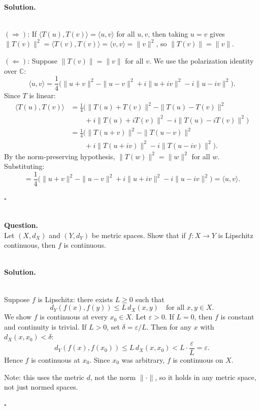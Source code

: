 \documentclass{article}
\begin{document}
\noindent\\
\textbf{Solution.}\\
\quad\\
\begin{mdframed}[linewidth=1pt]
$(\Rightarrow)$: If $\langle T(u), T(v) \rangle = \langle u, v \rangle$ for all $u, v$, then taking $u = v$ gives $\|T(v)\|^2 = \langle T(v), T(v) \rangle = \langle v, v \rangle = \|v\|^2$, so $\|T(v)\| = \|v\|$.

$(\Leftarrow)$: Suppose $\|T(v)\| = \|v\|$ for all $v$. We use the polarization identity over $\mathbb{C}$:
\[
\langle u, v \rangle = \frac{1}{4}\bigl(\|u+v\|^2 - \|u-v\|^2 + i\|u+iv\|^2 - i\|u-iv\|^2\bigr).
\]
Since $T$ is linear:
\begin{align*}
\langle T(u), T(v) \rangle &= \frac{1}{4}\bigl(\|T(u)+T(v)\|^2 - \|T(u)-T(v)\|^2 \\
&\qquad + i\|T(u)+iT(v)\|^2 - i\|T(u)-iT(v)\|^2\bigr) \\
&= \frac{1}{4}\bigl(\|T(u+v)\|^2 - \|T(u-v)\|^2 \\
&\qquad + i\|T(u+iv)\|^2 - i\|T(u-iv)\|^2\bigr).
\end{align*}
By the norm-preserving hypothesis, $\|T(w)\|^2 = \|w\|^2$ for all $w$. Substituting:
\[
= \frac{1}{4}\bigl(\|u+v\|^2 - \|u-v\|^2 + i\|u+iv\|^2 - i\|u-iv\|^2\bigr) = \langle u, v \rangle.
\]

\hfill $\square$
\end{mdframed}

\bigskip

\hfill \break  $~\!\!$ \dotfill \medskip \\
\textbf{Question.}\\
Let $(X, d_X)$ and $(Y, d_Y)$ be metric spaces. Show that if $f: X \to Y$ is Lipschitz continuous, then $f$ is continuous.

\noindent\\
\textbf{Solution.}\\
\quad\\
\begin{mdframed}[linewidth=1pt]
Suppose $f$ is Lipschitz: there exists $L \ge 0$ such that
\[
d_Y(f(x), f(y)) \le L\, d_X(x, y) \quad \text{for all } x, y \in X.
\]
We show $f$ is continuous at every $x_0 \in X$. Let $\varepsilon > 0$. If $L = 0$, then $f$ is constant and continuity is trivial. If $L > 0$, set $\delta = \varepsilon / L$. Then for any $x$ with $d_X(x, x_0) < \delta$:
\[
d_Y(f(x), f(x_0)) \le L\, d_X(x, x_0) < L \cdot \frac{\varepsilon}{L} = \varepsilon.
\]
Hence $f$ is continuous at $x_0$. Since $x_0$ was arbitrary, $f$ is continuous on $X$.

Note: this uses the metric $d$, not the norm $\|\cdot\|$, so it holds in any metric space, not just normed spaces.

\hfill $\square$
\end{mdframed}
\end{document}
